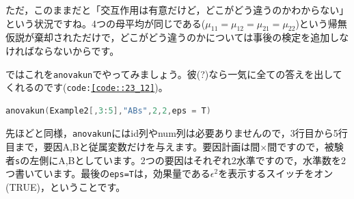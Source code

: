 \documentclass{ltjsarticle}
\begin{document}
ただ，このままだと「交互作用は有意だけど，どこがどう違うのかわからない」という状況ですね。4つの母平均が同じである($\mu_{11}=\mu_{12}=\mu_{21}=\mu_{22}$)という帰無仮説が棄却されただけで，どこがどう違うのかについては事後の検定を追加しなければならないからです。

ではこれを\texttt{anovakun}でやってみましょう。彼(?)なら一気に全ての答えを出してくれるのです(\texttt{code:\ref{code::23_12}})。
\begin{lstlisting}[language=c++,label={code::23_12},caption={anovakunで実行}]
anovakun(Example2[,3:5],"ABs",2,2,eps = T)
\end{lstlisting}
先ほどと同様，\texttt{anovakun}にはid列やnum列は必要ありませんので，3行目から5行目まで，要因A,Bと従属変数だけを与えます。要因計画は間$\times$間ですので，被験者\texttt{s}の左側にA,Bとしています。2つの要因はそれぞれ2水準ですので，水準数を2つ書いています。最後の\texttt{eps=T}は，効果量である$\epsilon^2$を表示するスイッチをオン(TRUE)，ということです。
\end{document}
